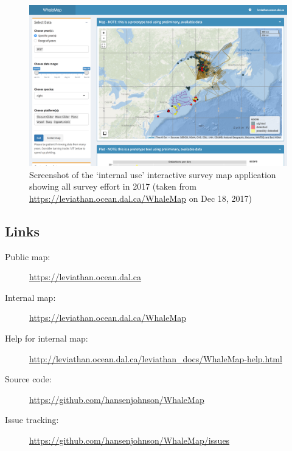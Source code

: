 \documentclass[11pt, letterpaper]{article}
\begin{document}
\begin{figure}[H]
	\centering
	\includegraphics[width=0.7\linewidth]{WhaleMap_all}
	\caption{Screenshot of the `internal use' interactive survey map application showing all survey effort in 2017 (taken from \url{https://leviathan.ocean.dal.ca/WhaleMap} on Dec 18, 2017)}
	\label{fig:whalemapall}
\end{figure}

\subsection{Links}

\begin{description}
	\item[Public map:] \url{https://leviathan.ocean.dal.ca	}
	\item[Internal map:] \url{https://leviathan.ocean.dal.ca/WhaleMap}
	\item[Help for internal map:] \url{http://leviathan.ocean.dal.ca/leviathan_docs/WhaleMap-help.html}
	\item[Source code:] \url{https://github.com/hansenjohnson/WhaleMap}
	\item[Issue tracking:] \url{https://github.com/hansenjohnson/WhaleMap/issues}
\end{description}

\end{document}
